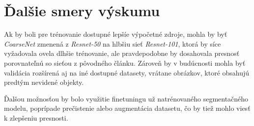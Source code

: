 \documentclass [11pt, a4paper, twocolumn]{article}
\begin{document}
\section{Ďalšie smery výskumu}
Ak by boli pre trénovanie dostupné lepšíe výpočetné zdroje, mohla by byť \textit{CoarseNet} zmenená z \textit{Resnet-50} na hlbšiu sieť \textit{Resnet-101}, ktorá by síce vyžadovala ovela dlhšie trénovanie, ale pravdepodobne by dosahovala presnosť porovnateľnú so sieťou z pôvodného článku. Zároveň by v budúcnosti mohla byť validácia rozšírená aj na iné dostupné datasety, vrátane obrázkov, ktoré obsahujú predtým nevidené objekty.

Ďalšou možnosťou by bolo využitie finetuningu už natrénovaného segmentačného modelu, poprípade prečistenie alebo augmentácia datasetu, čo by tiež mohlo viesť k zlepšeniu presnosti.


\newpage


\renewcommand{\refname}{Použitá literatúra}

\end{document}
